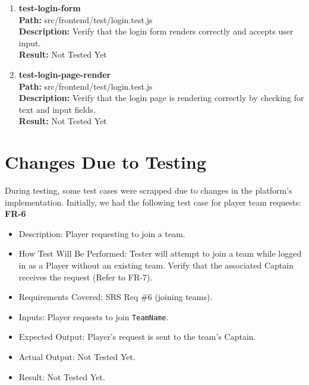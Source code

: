 \documentclass[12pt, titlepage]{article}
\begin{document}
\begin{enumerate}
    \item{\textbf{test-login-form}\\}
        \textbf{Path:} src/frontend/test/login.test.js\\
        \textbf{Description:} Verify that the login form renders correctly and accepts user input.\\
        \textbf{Result:} Not Tested Yet

    \item{\textbf{test-login-page-render}\\}
        \textbf{Path:} src/frontend/test/login.test.js\\
        \textbf{Description:} Verify that the login page is rendering correctly by checking for text and input fields.\\
        \textbf{Result:} Not Tested Yet
\end{enumerate}

\section{Changes Due to Testing}


During testing, some test cases were scrapped due to changes in the platform's implementation. Initially, we had the following test case for player team requests:\\

   \textbf{FR-6}  
      \begin{itemize}
          \item Description: Player requesting to join a team.
          \item How Test Will Be Performed: Tester will attempt to join a team while logged in as a Player without an existing team. Verify that the associated Captain receives the request (Refer to FR-7).
          \item Requirements Covered: SRS Req \#6 (joining teams).
          \item Inputs: Player requests to join \texttt{TeamName}.
          \item Expected Output: Player’s request is sent to the team’s Captain.
          \item Actual Output: Not Tested Yet.
          \item Result: Not Tested Yet.
      \end{itemize}
\end{document}
